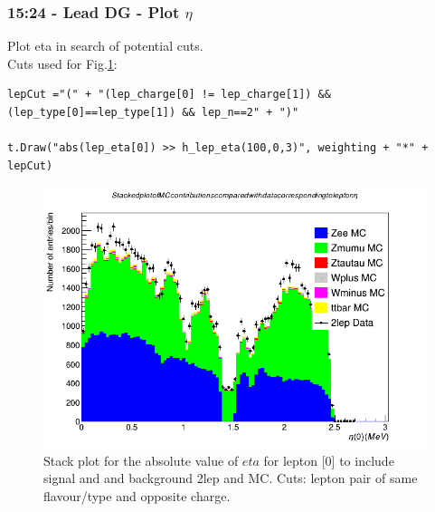 \subsubsection*{15:24 - Lead DG - Plot $\eta$}
Plot eta in search of potential cuts. 
\\
Cuts used for Fig.\ref{fig:15-24_23-02-21}:
\begin{lstlisting}
lepCut ="(" + "(lep_charge[0] != lep_charge[1]) && (lep_type[0]==lep_type[1]) && lep_n==2" + ")"
    
t.Draw("abs(lep_eta[0]) >> h_lep_eta(100,0,3)", weighting + "*" + lepCut)
\end{lstlisting}
\begin{figure}[h!]
    \centering
	\includegraphics[width=0.85\linewidth]{plots/23-02-2021/All-stack-fast_eta_0-3_.png}
	\caption{Stack plot for the absolute value of $eta$ for lepton [0] to include signal and and background 2lep and MC.  Cuts: lepton pair of same flavour/type and opposite charge. }\label{fig:15-24_23-02-21}
\end{figure}


